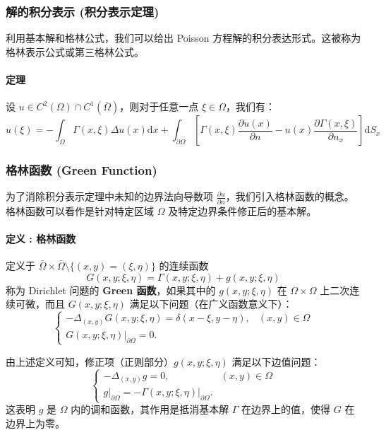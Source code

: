 \documentclass[12pt,a4paper]{ctexart}
\begin{document}
	\subsubsection{解的积分表示 (积分表示定理)}
	
	利用基本解和格林公式，我们可以给出 Poisson 方程解的积分表达形式。这被称为格林表示公式或第三格林公式。
	
	\paragraph{定理}
	设 $u \in C^2(\Omega) \cap C^1(\bar{\Omega})$，则对于任意一点 $\xi \in \Omega$，我们有：
	\begin{equation}
		u(\xi) = - \int_{\Omega} \Gamma(x, \xi) \Delta u(x) \mathrm{d}x + \int_{\partial \Omega} \left[ \Gamma(x, \xi) \frac{\partial u(x)}{\partial n} - u(x) \frac{\partial \Gamma(x, \xi)}{\partial n_x} \right] \mathrm{d}S_x
	\end{equation}
	
	\subsubsection{格林函数 (Green Function)}
	
	为了消除积分表示定理中未知的边界法向导数项 $\frac{\partial u}{\partial n}$，我们引入格林函数的概念。格林函数可以看作是针对特定区域 $\Omega$ 及特定边界条件修正后的基本解。
	
	\paragraph{定义  : 格林函数}
	定义于 $\bar{\Omega} \times \bar{\Omega} \setminus \{ (x,y)=(\xi,\eta) \}$ 的连续函数
	\begin{equation}
		G(x,y; \xi,\eta) = \Gamma(x,y; \xi,\eta) + g(x,y; \xi,\eta)
	\end{equation}
	称为 Dirichlet 问题的 \textbf{Green 函数}，如果其中的 $g(x,y; \xi,\eta)$ 在 $\Omega \times \Omega$ 上二次连续可微，而且 $G(x,y; \xi,\eta)$ 满足以下问题（在广义函数意义下）：
	\begin{equation}
		\begin{cases}
			-\Delta_{(x,y)} G(x,y; \xi,\eta) = \delta(x-\xi, y-\eta), & (x,y) \in \Omega \\
			G(x,y; \xi,\eta) \big|_{\partial \Omega} = 0. &
		\end{cases}
	\end{equation}
	
	由上述定义可知，修正项（正则部分）$g(x,y; \xi,\eta)$ 满足以下边值问题：
	\begin{equation}
		\begin{cases}
			-\Delta_{(x,y)} g = 0, & (x,y) \in \Omega \\
			g \big|_{\partial \Omega} = -\Gamma(x,y; \xi,\eta) \big|_{\partial \Omega}. &
		\end{cases}
	\end{equation}
	这表明 $g$ 是 $\Omega$ 内的调和函数，其作用是抵消基本解 $\Gamma$ 在边界上的值，使得 $G$ 在边界上为零。
	
\end{document}
